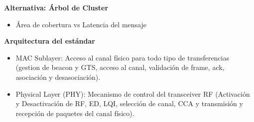 \documentclass[aspectratio=169]{beamer}
\begin{document}
\begin{frame}{\textbf{Alternativa: Árbol de Cluster}}
\begin{minipage}[c]{1.0\linewidth}
	\begin{minipage}[c]{0.6\linewidth}
		\begin{itemize}
			\item Área de cobertura vs Latencia del mensaje 
			\vspace{10px}
	  	\end{itemize}	
	\end{minipage}
	\begin{minipage}[c]{0.35\linewidth}
		\begin{figure}[H]
		\end{figure}	  	  	
	\end{minipage}
\end{minipage}
\end{frame}


\begin{frame}{\textbf{Arquitectura del estándar}}

\begin{minipage}[c]{1.0\linewidth}
	
	\begin{minipage}[c]{0.6\linewidth}
		\begin{itemize}
			\item MAC Sublayer: Acceso al canal físico para todo tipo de transferencias (gestion de beacon y GTS, acceso al canal, validación de frame, ack, asociación y desasociación). 
			\vspace{10px}
			\item Physical Layer (PHY): Mecanismo de control del transceiver RF (Activación y Desactivación de RF, ED, LQI, selección de canal, CCA y transmisión y recepción de paquetes del canal físico). 
			\vspace{10px}
	  	\end{itemize}	
	  \end{minipage}

	  \begin{minipage}[c]{0.35\linewidth}
		\begin{figure}[H]
		\end{figure}	  	  	
	  \end{minipage}
	\end{minipage}

\end{frame}
\end{document}
